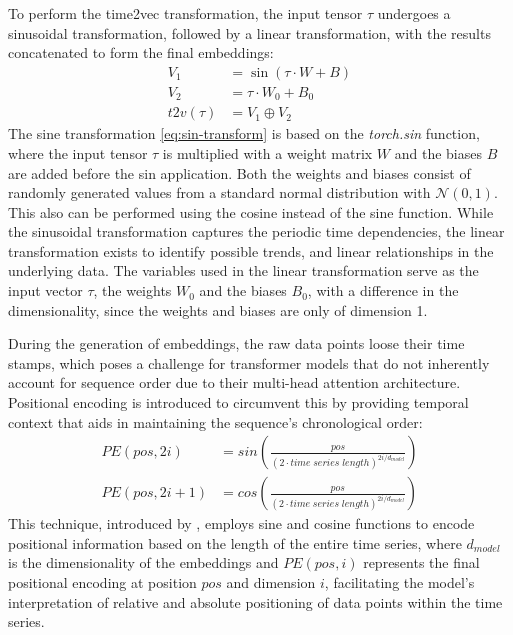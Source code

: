 \documentclass{article}
\begin{document}
To perform the time2vec transformation, the input tensor $\tau$ undergoes a sinusoidal transformation, followed by a linear transformation, with the results concatenated to form the final embeddings:
\begin{align}\label{eq:sin-transform}
    V_1 &= \sin(\tau \cdot W + B) \\
    V_2 &= \tau \cdot W_0 + B_0 \\
    t2v(\tau) &= V_1 \oplus V_2
\end{align}
The sine transformation \ref{eq:sin-transform} is based on the \textit{torch.sin} function, where the input tensor $\tau$ is multiplied with a weight matrix $W$ and the biases $B$ are added before the sin application. Both the weights and biases consist of randomly generated values from a standard normal distribution with $\mathcal{N}(0,1)$. This also can be performed using the cosine instead of the sine function. While the sinusoidal transformation captures the periodic time dependencies, the linear transformation exists to identify possible trends, and linear relationships in the underlying data. The variables used in the linear transformation serve as the input vector $\tau$, the weights $W_0$ and the biases $B_0$, with a difference in the dimensionality, since the weights and biases are only of dimension 1.

During the generation of embeddings, the raw data points loose their time stamps, which poses a challenge for transformer models that do not inherently account for sequence order due to their multi-head attention architecture. Positional encoding is introduced to circumvent this by providing temporal context that aids in maintaining the sequence's chronological order:
\begin{align}\label{eq:pos-encoding}
    PE(pos, 2i) &= sin \left( \frac{pos}{(2 \cdot time \; series \; length)^{2i / d_{model}}} \right) \\
    PE(pos, 2i + 1) &= cos \left( \frac{pos}{(2 \cdot time \; series \; length)^{2i / d_{model}}} \right)
\end{align}
This technique, introduced by \cite{vanilla-transformer}, employs sine and cosine functions to encode positional information based on the length of the entire time series, where $d_{model}$ is the dimensionality of the embeddings and $PE(pos, i)$ represents the final positional encoding at position $pos$ and dimension $i$, facilitating the model's interpretation of relative and absolute positioning of data points within the time series.
\end{document}
